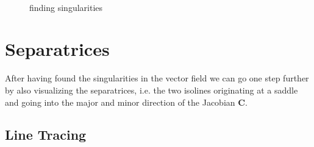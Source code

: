 \documentclass[a4paper,10pt,notitlepage]{scrreprt}
\newcommand{\mat}[1]{\mathbf{#1}}
\begin{document}
\begin{figure}
  \centering
  \\
  \caption{finding singularities}
  \label{fig:singularities}
\end{figure}

\section{Separatrices}

After having found the singularities in the vector field we can go one step
further by also visualizing the separatrices, i.e. the two isolines originating
at a saddle and going into the major and minor direction of the Jacobian
$\mat{C}$.

\subsection{Line Tracing}
\end{document}
